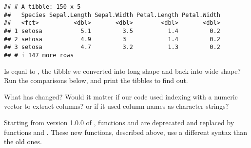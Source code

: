 \documentclass[krantz2]{krantz}\usepackage{knitr}
\begin{document}
\begin{knitrout}\footnotesize
{}\color{fgcolor}\begin{kframe}
\begin{alltt}
 \hlkwb{<-}
               \hlstd{=} \hlstd{,}
               \hlstd{=} \hlstd{,}
               
  \hlstd{(} \hlstd{=} \hlopt{-}
\end{alltt}
\begin{verbatim}
## # A tibble: 150 x 5
##   Species Sepal.Length Sepal.Width Petal.Length Petal.Width
##   <fct>          <dbl>       <dbl>        <dbl>       <dbl>
## 1 setosa           5.1         3.5          1.4         0.2
## 2 setosa           4.9         3            1.4         0.2
## 3 setosa           4.7         3.2          1.3         0.2
## # i 147 more rows
\end{verbatim}
\end{kframe}
\end{knitrout}

\begin{playground}
Is  equal to , the tibble we converted into long shape and back into wide shape? Run the comparisons below, and print the tibbles to find out.
  
\begin{knitrout}\footnotesize
{}\color{fgcolor}\begin{kframe}
\begin{alltt}
\hlstd{(iris.tb, wide_iris.tb[ ,} \hlstd{(iris.tb)])}
\end{alltt}
\end{kframe}
\end{knitrout}

What has changed? Would it matter if our code used indexing with a numeric vector to extract columns? or if it used column names as character strings?

\end{playground}

\begin{warningbox}
  Starting from version 1.0.0 of , functions  and  are deprecated and replaced by functions  and . These new functions, described above, use a different syntax than the old ones.
\end{warningbox}
\end{document}
